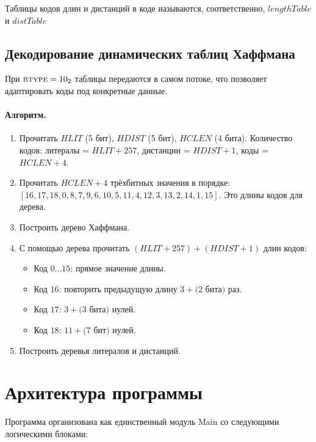 \documentclass[12pt,a4paper]{article}
\begin{document}
Таблицы кодов длин и дистанций в коде называются, соответственно, $lengthTable$ и $distTable$

\subsection{Декодирование динамических таблиц Хаффмана}

При $\textsc{btype}=10_2$ таблицы передаются в самом потоке,
что позволяет адаптировать коды под конкретные данные.

\paragraph{Алгоритм.}
\begin{enumerate}
  \item Прочитать $HLIT$ (5 бит), $HDIST$ (5 бит), $HCLEN$ (4 бита).
        Количество кодов: литералы = $HLIT+257$, дистанции = $HDIST+1$,
        коды = $HCLEN+4$.
  \item Прочитать $HCLEN+4$ трёхбитных значения в порядке:\\
        $[16,17,18,0,8,7,9,6,10,5,11,4,12,3,13,2,14,1,15]$.
        Это длины кодов для дерева.
  \item Построить дерево Хаффмана.
  \item С помощью дерева прочитать $(HLIT+257) + (HDIST+1)$
        длин кодов:
        \begin{itemize}
          \item Код $0\dots15$: прямое значение длины.
          \item Код $16$: повторить предыдущую длину $3+\text{(2 бита)}$ раз.
          \item Код $17$: $3+\text{(3 бита)}$ нулей.
          \item Код $18$: $11+\text{(7 бит)}$ нулей.
        \end{itemize}
  \item Построить деревья литералов и дистанций.
\end{enumerate}

\section{Архитектура программы}

Программа организована как единственный модуль Main со следующими
логическими блоками:
\end{document}
